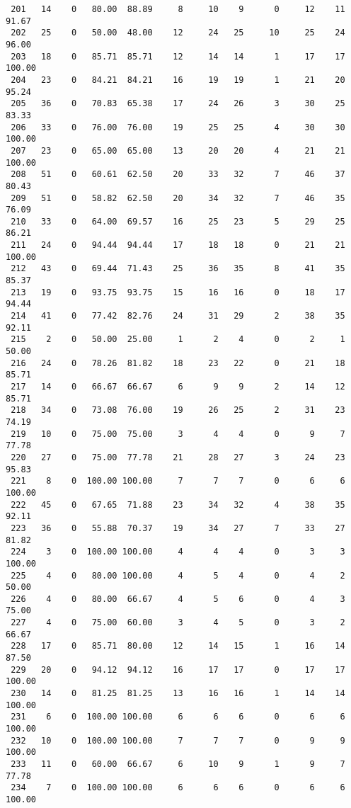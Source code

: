 \begin{verbatim}
 201   14    0   80.00  88.89     8     10    9      0     12    11    91.67
 202   25    0   50.00  48.00    12     24   25     10     25    24    96.00
 203   18    0   85.71  85.71    12     14   14      1     17    17   100.00
 204   23    0   84.21  84.21    16     19   19      1     21    20    95.24
 205   36    0   70.83  65.38    17     24   26      3     30    25    83.33
 206   33    0   76.00  76.00    19     25   25      4     30    30   100.00
 207   23    0   65.00  65.00    13     20   20      4     21    21   100.00
 208   51    0   60.61  62.50    20     33   32      7     46    37    80.43
 209   51    0   58.82  62.50    20     34   32      7     46    35    76.09
 210   33    0   64.00  69.57    16     25   23      5     29    25    86.21
 211   24    0   94.44  94.44    17     18   18      0     21    21   100.00
 212   43    0   69.44  71.43    25     36   35      8     41    35    85.37
 213   19    0   93.75  93.75    15     16   16      0     18    17    94.44
 214   41    0   77.42  82.76    24     31   29      2     38    35    92.11
 215    2    0   50.00  25.00     1      2    4      0      2     1    50.00
 216   24    0   78.26  81.82    18     23   22      0     21    18    85.71
 217   14    0   66.67  66.67     6      9    9      2     14    12    85.71
 218   34    0   73.08  76.00    19     26   25      2     31    23    74.19
 219   10    0   75.00  75.00     3      4    4      0      9     7    77.78
 220   27    0   75.00  77.78    21     28   27      3     24    23    95.83
 221    8    0  100.00 100.00     7      7    7      0      6     6   100.00
 222   45    0   67.65  71.88    23     34   32      4     38    35    92.11
 223   36    0   55.88  70.37    19     34   27      7     33    27    81.82
 224    3    0  100.00 100.00     4      4    4      0      3     3   100.00
 225    4    0   80.00 100.00     4      5    4      0      4     2    50.00
 226    4    0   80.00  66.67     4      5    6      0      4     3    75.00
 227    4    0   75.00  60.00     3      4    5      0      3     2    66.67
 228   17    0   85.71  80.00    12     14   15      1     16    14    87.50
 229   20    0   94.12  94.12    16     17   17      0     17    17   100.00
 230   14    0   81.25  81.25    13     16   16      1     14    14   100.00
 231    6    0  100.00 100.00     6      6    6      0      6     6   100.00
 232   10    0  100.00 100.00     7      7    7      0      9     9   100.00
 233   11    0   60.00  66.67     6     10    9      1      9     7    77.78
 234    7    0  100.00 100.00     6      6    6      0      6     6   100.00

\end{verbatim}
